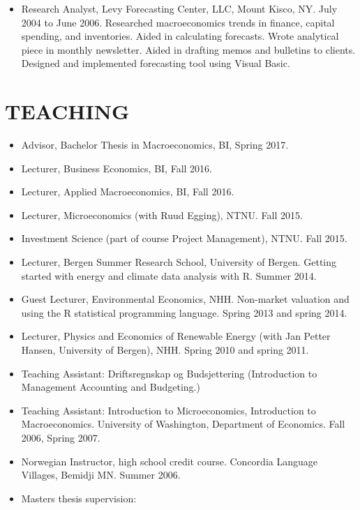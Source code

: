 \documentclass[margin]{res}
\begin{document}
\begin{resume}
\begin{itemize}
                  \item[] Research Analyst, Levy Forecasting Center, LLC, Mount Kisco, NY. July 2004 to June 2006.  
                  Researched macroeconomics trends in finance, capital spending, and inventories. Aided in calculating forecasts. Wrote analytical piece in monthly newsletter. Aided in drafting memos and bulletins to clients. Designed and implemented forecasting tool using Visual Basic. 

                  \end{itemize}
                   
\section{TEACHING} 
\begin{itemize}
\setlength{\itemsep}{10pt}
\item[] Advisor, Bachelor Thesis in Macroeconomics, BI, Spring 2017. 
\item[] Lecturer, Business Economics, BI, Fall 2016. 
\item[] Lecturer, Applied Macroeconomics, BI, Fall 2016.
\item[] Lecturer, Microeconomics (with Ruud Egging), NTNU.  Fall 2015.
\item[] Investment Science (part of course Project Management), NTNU.  Fall 2015.
\item[] Lecturer, Bergen Summer Research School, University of Bergen.  Getting started with energy and climate data analysis with R.  Summer 2014.
\item[] Guest Lecturer, Environmental Economics, NHH.  Non-market valuation and using the R statistical programming language.  Spring 2013 and spring 2014.
\item[] Lecturer, Physics and Economics of Renewable Energy (with Jan Petter Hansen, University of Bergen), NHH.  Spring 2010 and spring 2011.
\item[] Teaching Assistant: Driftsregnskap og Budsjettering (Introduction to Management Accounting and Budgeting.)
\item[] Teaching Assistant: Introduction to Microeconomics, Introduction to Macroeconomics.  University of Washington, Department of Economics. Fall 2006, Spring 2007.
\item[] Norwegian Instructor, high school credit course.  Concordia Language Villages, Bemidji MN.  Summer 2006.  
\item [] Masters thesis supervision:
  \begin{itemize}

\end{itemize}
\end{itemize}
\end{resume}
\end{document}
